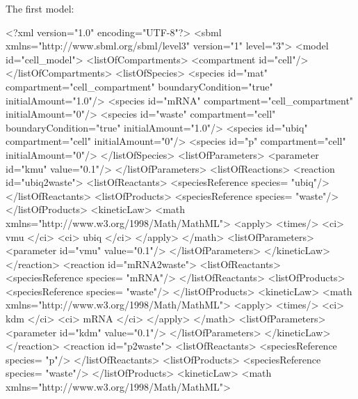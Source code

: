 \documentclass{cekarticle}
\begin{document}
The first model:
\begin{example}
<?xml version="1.0" encoding="UTF-8"?>
<sbml xmlns="http://www.sbml.org/sbml/level3" version="1" level="3">
<model id="cell_model">
    <listOfCompartments>
        <compartment id="cell"/>
    </listOfCompartments>
    <listOfSpecies>
        <species id="mat" compartment="cell_compartment" boundaryCondition="true"
            initialAmount="1.0"/>
        <species id="mRNA" compartment="cell_compartment" initialAmount="0"/>
        <species id="waste" compartment="cell" boundaryCondition="true" initialAmount="1.0"/>
        <species id="ubiq" compartment="cell" initialAmount="0"/>
        <species id="p" compartment="cell" initialAmount="0"/>
    </listOfSpecies>
    <listOfParameters>
        <parameter id="kmu" value="0.1"/>
    </listOfParameters>
    <listOfReactions>
        <reaction id="ubiq2waste">
            <listOfReactants>
                <speciesReference species= "ubiq"/>
            </listOfReactants>
            <listOfProducts>
                <speciesReference species= "waste"/>
            </listOfProducts>
            <kineticLaw>
                <math xmlns="http://www.w3.org/1998/Math/MathML">
                    <apply>
                        <times/>
                        <ci> vmu </ci>
                        <ci> ubiq </ci>
                    </apply>
                </math>
                <listOfParameters>
                    <parameter id="vmu" value="0.1"/>
                </listOfParameters>
            </kineticLaw>
        </reaction>
        <reaction id="mRNA2waste">
            <listOfReactants>
                <speciesReference species= "mRNA"/>
            </listOfReactants>
            <listOfProducts>
                <speciesReference species= "waste"/>
            </listOfProducts>
            <kineticLaw>
                <math xmlns="http://www.w3.org/1998/Math/MathML">
                    <apply>
                        <times/>
                        <ci> kdm </ci>
                        <ci> mRNA </ci>
                    </apply>
                </math>
                <listOfParameters>
                    <parameter id="kdm" value="0.1"/>
                </listOfParameters>
            </kineticLaw>
        </reaction>
        <reaction id="p2waste">
            <listOfReactants>
                <speciesReference species= "p"/>
            </listOfReactants>
            <listOfProducts>
                <speciesReference species= "waste"/>
            </listOfProducts>
            <kineticLaw>
                <math xmlns="http://www.w3.org/1998/Math/MathML">

\end{example}
\end{document}
